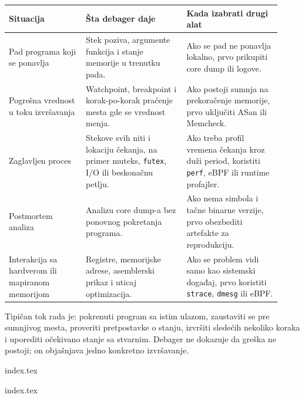 \begin{longtable}{@{}p{0.26\linewidth}p{0.34\linewidth}p{0.32\linewidth}@{}}
\toprule\noalign{}
Situacija & Šta debager daje & Kada izabrati drugi alat \\
\midrule\noalign{}
\endhead
\bottomrule\noalign{}
\endlastfoot
Pad programa koji se ponavlja & Stek poziva, argumente funkcija i stanje memorije u trenutku pada. & Ako se pad ne ponavlja lokalno, prvo prikupiti core dump ili logove. \\
Pogrešna vrednost u toku izvršavanja & Watchpoint, breakpoint i korak-po-korak praćenje mesta gde se vrednost menja. & Ako postoji sumnja na prekoračenje memorije, prvo uključiti ASan ili Memcheck. \\
Zaglavljen proces & Stekove svih niti i lokaciju čekanja, na primer muteks, \texttt{futex}, I/O ili beskonačnu petlju. & Ako treba profil vremena čekanja kroz duži period, koristiti \texttt{perf}, eBPF ili runtime profajler. \\
Postmortem analiza & Analizu core dump-a bez ponovnog pokretanja programa. & Ako nema simbola i tačne binarne verzije, prvo obezbediti artefakte za reprodukciju. \\
Interakcija sa hardverom ili mapiranom memorijom & Registre, memorijske adrese, asemblerski prikaz i uticaj optimizacija. & Ako se problem vidi samo kao sistemski događaj, prvo koristiti \texttt{strace}, \texttt{dmesg} ili eBPF. \\
\end{longtable}

Tipičan tok rada je: pokrenuti program sa istim ulazom, zaustaviti se pre sumnjivog mesta, proveriti pretpostavke o stanju, izvršiti sledećih nekoliko koraka i uporediti očekivano stanje sa stvarnim. Debager ne dokazuje da greška ne postoji; on objašnjava jedno konkretno izvršavanje.

{index.tex}

{index.tex}
